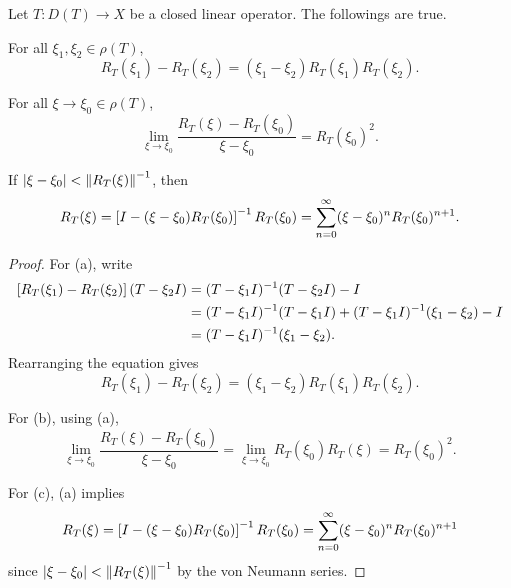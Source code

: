 \begin{proposition}
    Let $T:D(T)\to X$ be a closed linear operator. The followings are true. 
    \begin{thmenum}
        \item For all $\xi_1,\xi_2\in\rho(T)$, 
        \begin{equation*}
            R_T(\xi_1) - R_T(\xi_2) = (\xi_1-\xi_2)R_T(\xi_1)R_T(\xi_2).
        \end{equation*}
        \item For all $\xi\to\xi_0\in\rho(T)$, 
        \begin{equation*}
            \lim_{\xi\to\xi_0} \frac{R_T(\xi) - R_T(\xi_0)}{\xi - \xi_0} = R_T(\xi_0)^2.
        \end{equation*}
        \item If $\left\lvert {\xi - \xi_0} \right\rvert<\left\lVert {R_T(\xi)} \right\rVert^{-1}$, then
        \begin{equation*}
            R_T(\xi) = \left[ {I - (\xi - \xi_0)R_T(\xi_0)} \right]^{-1}R_T(\xi_0) = \sum_{n=0}^\infty (\xi - \xi_0)^n R_T(\xi_0)^{n+1}.
        \end{equation*}
    \end{thmenum} 
\end{proposition}
\begin{proof}
    For (a), write 
    \begin{equation*}
        \begin{split}
            \left[ {R_T(\xi_1) - R_T(\xi_2)} \right](T - \xi_2I) 
            &= (T - \xi_1I)^{-1}(T - \xi_2I) - I \\ 
            &= (T - \xi_1I)^{-1}(T - \xi_1I) + (T - \xi_1I)^{-1}(\xi_1 - \xi_2) - I \\
            &= (T - \xi_1I)^{-1}(\xi_1 - \xi_2).
        \end{split}
    \end{equation*}
    Rearranging the equation gives 
    \begin{equation*}
        R_T(\xi_1) - R_T(\xi_2) = (\xi_1 - \xi_2)R_T(\xi_1)R_T(\xi_2).
    \end{equation*}

    For (b), using (a), 
    \begin{equation*}
        \lim_{\xi\to\xi_0} \frac{R_T(\xi) - R_T(\xi_0)}{\xi - \xi_0} 
        = \lim_{\xi\to\xi_0} R_T(\xi_0)R_T(\xi) = R_T(\xi_0)^2.
    \end{equation*}

    For (c), (a) implies 
    \begin{equation*}
        R_T(\xi) = \left[ {I - (\xi - \xi_0)R_T(\xi_0)} \right]^{-1}R_T(\xi_0) 
        = \sum_{n=0}^\infty (\xi - \xi_0)^n R_T(\xi_0)^{n+1}
    \end{equation*}
    since $\left\lvert {\xi - \xi_0} \right\rvert<\left\lVert {R_T(\xi)} \right\rVert^{-1}$ by the von Neumann series.
\end{proof}

